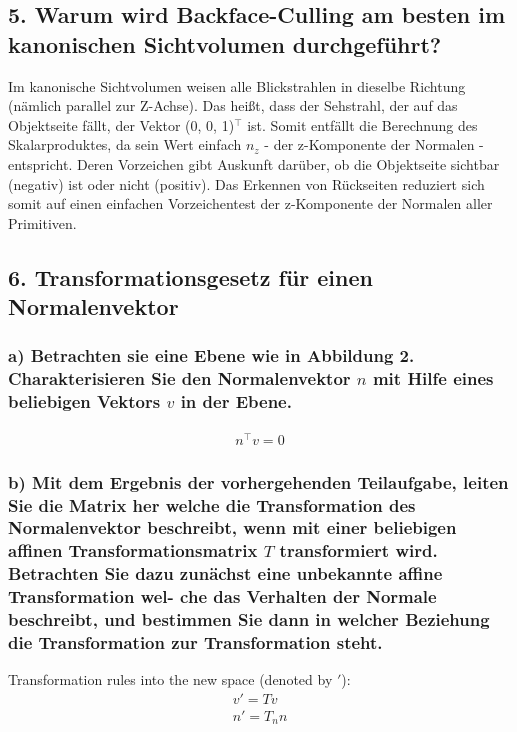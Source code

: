 \documentclass[a4paper,headings=small]{scrartcl}
\numberwithin{equation}{section} %
\numberwithin{figure}{section}   %
\begin{document}
\subsection{5. Warum wird Backface-Culling am besten im kanonischen Sichtvolumen durchgeführt?}

Im kanonische Sichtvolumen weisen alle Blickstrahlen in dieselbe Richtung (nämlich parallel zur Z-Achse).
Das heißt, dass der Sehstrahl, der auf das Objektseite fällt, der Vektor (0, 0, 1)$^{\top}$ ist.
Somit entfällt die Berechnung des Skalarproduktes, da sein Wert einfach $n_z$ - der z-Komponente der Normalen - entspricht.
Deren Vorzeichen gibt Auskunft darüber, ob die Objektseite sichtbar (negativ) ist oder nicht (positiv).
Das Erkennen von Rückseiten reduziert sich somit auf einen einfachen Vorzeichentest der z-Komponente der Normalen aller Primitiven.

\subsection{6. Transformationsgesetz für einen Normalenvektor}

\subsubsection{a) Betrachten sie eine Ebene wie in Abbildung 2. Charakterisieren Sie den Normalenvektor $n$ mit Hilfe eines beliebigen Vektors $v$ in der Ebene.}

\begin{align}
\label{eqn:orthogonality} n^{\top} v = 0
\end{align}

\subsubsection{b) Mit dem Ergebnis der vorhergehenden Teilaufgabe, leiten Sie die Matrix her welche die Transformation des Normalenvektor beschreibt, wenn mit einer beliebigen affinen Transformationsmatrix
$T$ transformiert wird. Betrachten Sie dazu zunächst eine unbekannte affine Transformation wel-
che das Verhalten der Normale beschreibt, und bestimmen Sie dann in welcher Beziehung die
Transformation zur Transformation steht.}

Transformation rules into the new space (denoted by $'$):
\begin{align}
v' = T v \\
n' = T_n n
\end{align}
\end{document}
